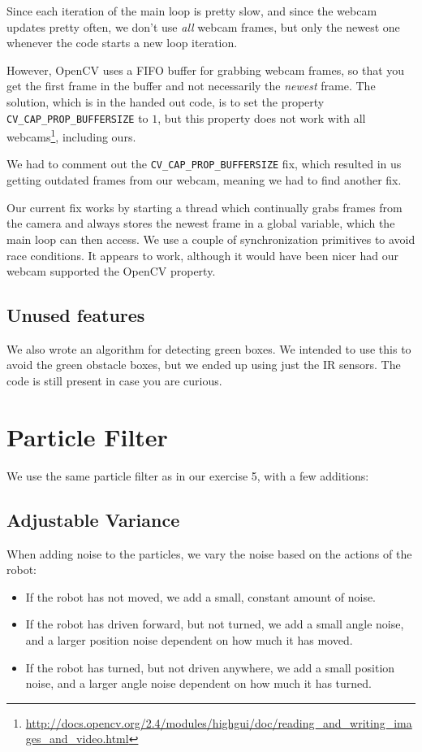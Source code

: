 \documentclass[a4paper,12pt]{article}
\begin{document}
Since each iteration of the main loop is pretty slow, and since the webcam
updates pretty often, we don't use \emph{all} webcam frames, but only the newest
one whenever the code starts a new loop iteration.

However, OpenCV uses a FIFO buffer for grabbing webcam frames, so that you get
the first frame in the buffer and not necessarily the \emph{newest} frame.  The
solution, which is in the handed out code, is to set the property
\texttt{CV_CAP_PROP_BUFFERSIZE} to $1$, but this property does not work with all
webcams\footnote{\url{http://docs.opencv.org/2.4/modules/highgui/doc/reading_and_writing_images_and_video.html}},
including ours.

We had to comment out the \texttt{CV_CAP_PROP_BUFFERSIZE} fix, which resulted in
us getting outdated frames from our webcam, meaning we had to find another fix.

Our current fix works by starting a thread which continually grabs frames from
the camera and always stores the newest frame in a global variable, which the
main loop can then access.  We use a couple of synchronization primitives to
avoid race conditions.  It appears to work, although it would have been nicer
had our webcam supported the OpenCV property.


\subsection{Unused features}

We also wrote an algorithm for detecting green boxes.  We intended to use this
to avoid the green obstacle boxes, but we ended up using just the IR sensors.
The code is still present in case you are curious.


\newpage
\section{Particle Filter}

We use the same particle filter as in our exercise 5, with a few additions:

\subsection{Adjustable Variance}

When adding noise to the particles, we vary the noise based on the actions of
the robot:

\begin{itemize}
\item If the robot has not moved, we add a small, constant amount of noise.
\item If the robot has driven forward, but not turned, we add a small angle
noise, and a larger position noise dependent on how much it has moved.
\item If the robot has turned, but not driven anywhere, we add a small position
noise, and a larger angle noise dependent on how much it has turned.
\end{itemize}
\end{document}
